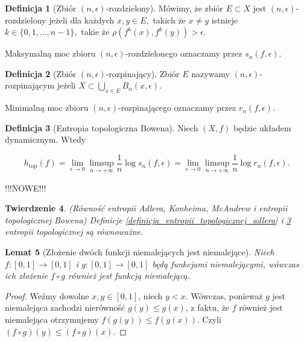 \documentclass[licencjacka]{pwr_wmat_praca_dyplomowa}
\theoremstyle{plain}
\newtheorem{theorem}{Twierdzenie}
\numberwithin{theorem}{chapter}
\newtheorem{lemma}[theorem]{Lemat}
\theoremstyle{definition}
\numberwithin{theorem}{chapter}
\newtheorem{definition}[theorem]{Definicja}
\begin{document}
\begin{definition}[Zbiór $(n,\epsilon)$-rozdzielony]
Mówimy, że zbiór $E \subset X$ jest $(n, \epsilon)$-rozdzielony jeżeli dla każdych $x, y \in E,$ takich że $x \neq y$ istnieje $k \in \{0, 1, \ldots, n-1\},$ takie że $\rho(f^k(x), f^k(y)) > \epsilon.$

Maksymalną moc zbioru $(n, \epsilon)$-rozdzielonego oznaczamy przez $s_n(f, \epsilon).$
\end{definition}


\begin{definition}[Zbiór $(n, \epsilon)$-rozpinający]
Zbiór $E$ nazywamy $(n,\epsilon)$-rozpinającym jeżeli $X \subset \bigcup_{x \in E}B_n(x, \epsilon)$.

Minimalną moc zbioru $(n, \epsilon)$-rozpinającego oznaczamy przez $r_n(f, \epsilon).$

\end{definition}


\begin{definition}[Entropia topologiczna Bowena]
\label{definicja_entropii_topologicznej_bowena}
Niech $(X, f)$ będzie układem dynamicznym.
Wtedy

$$h_{\textrm{top}}(f) = \lim_{\epsilon \rightarrow 0} \limsup_{n \rightarrow +\infty} \frac{1}{n} \log s_n(f, \epsilon) = \lim_{\epsilon \rightarrow 0} \limsup_{n \rightarrow +\infty} \frac{1}{n} \log r_n(f, \epsilon).$$

\end{definition}

{\color{red} !!!NOWE!!!
\begin{theorem}(Równość entropii Adlera, Konheima, McAndrew i entropii topologicznej Bowena)
Definicje \ref{definicja_entropii_topologicznej_adlera} i \ref{definicja_entropii_topologicznej_bowena} entropii topologicznej są równoważne. \cite[s.~59]{ruette2017chaos}
\end{theorem}
} 
 

\begin{lemma}[Złożenie dwóch funkcji niemalejących jest niemalejące]
\label{zlozenie_dwoch_niemalejacych_jest_niemalejace}
Niech $f: [0, 1] \rightarrow [0, 1]$ i $g: [0, 1] \rightarrow [0,1]$ będą funkcjami niemalejącymi, wówczas ich złożenie $f \circ g$ również jest funkcją niemalejącą. 
\end{lemma}

\begin{proof}
Weźmy dowolne $x, y \in [0,1]$, niech $y < x$. Wówczas, ponieważ $g$ jest niemalejąca zachodzi nierówność $g(y) \leq g(x)$, z faktu, że $f$ również jest niemalejąca otrzymujemy $f(g(y)) \leq f(g(x)).$ Czyli $(f \circ g)(y) \leq (f \circ g)(x).$
\end{proof} 
\end{document}
